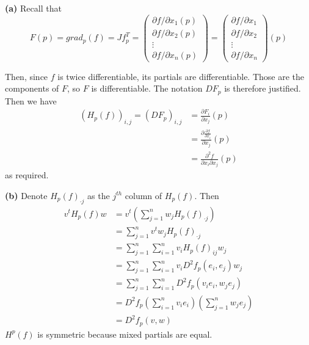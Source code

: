 \documentclass[a4paper, 12pt]{article}
\begin{document}
\begin{solution}
    \textbf{(a)} Recall that \[
        F(p) = grad_p(f) = Jf_p^T = \begin{pmatrix}
            \partial f/\partial x_1 (p) \\
            \partial f/\partial x_2 (p) \\
            \vdots                      \\
            \partial f/\partial x_n (p)
        \end{pmatrix} = \begin{pmatrix}
            \partial f/\partial x_1 \\
            \partial f/\partial x_2 \\
            \vdots                  \\
            \partial f/\partial x_n
        \end{pmatrix}(p)
    \]

    Then, since $f$ is twice differentiable, its partials are differentiable. Those are the components of $F$, so $F$ is differentiable. The notation $DF_p$ is therefore justified. Then we have
    \begin{align*}
        (H_p(f))_{i, j} = (DF_p)_{i, j} & = \frac{\partial F_i}{\partial x_j}(p)                              \\
                                        & = \frac{\partial \frac{\partial f}{\partial x_i}}{\partial x_j} (p) \\
                                        & = \frac{\partial^2 f}{\partial x_i \partial x_j}(p)
    \end{align*}
    as required.

    \textbf{(b)}
    Denote $H_p(f)_{\cdot j}$ as the $j^{th}$ column of $H_p(f)$. Then
    \begin{align*}
        v^t H_p(f) w & = v^t \left(\sum_{j=1}^{n} w_j H_p(f)_{\cdot j}\right)                        \\
                     & = \sum_{j=1}^{n} v^t w_j H_p(f)_{\cdot j}                                     \\
                     & = \sum_{j=1}^n \sum_{i=1}^{n} v_i H_p(f)_{ij} w_j                             \\
                     & = \sum_{j=1}^{n} \sum_{i=1}^{n} v_i D^2f_p(e_i, e_j) w_j                      \\
                     & = \sum_{j=1}^{n} \sum_{i=1}^{n} D^2f_p(v_ie_i, w_je_j)                        \\
                     & = D^2f_p\left(\sum_{i=1}^{n} v_i e_i\right)\left(\sum_{j=1}^{n} w_je_j\right) \\
                     & = D^2f_p(v, w)
    \end{align*}
    $H^p(f)$ is symmetric because mixed partials are equal.


\end{solution}
\end{document}
